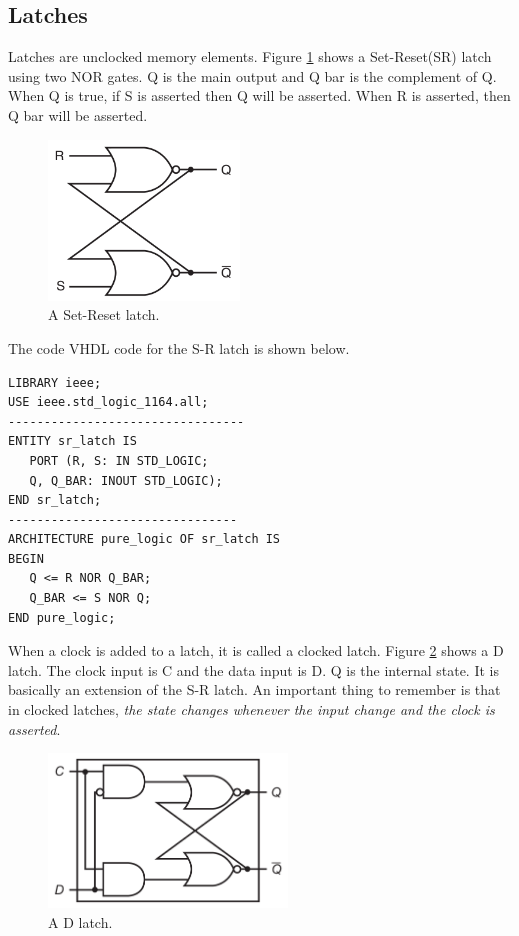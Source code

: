 \documentclass[a4paper, 11pt,oneside]{article}
\begin{document}
\subsection{Latches}
Latches are unclocked memory elements. Figure \ref{fig:latch0} shows a
Set-Reset(SR) latch using two NOR gates. Q is the main output and Q bar is the 
complement of Q. When Q is true, if S is asserted then Q will be asserted. 
When R is asserted, then Q bar will be asserted. 

\begin{figure}[H]
	\begin{center}
	\includegraphics[width=2in]{latch0.png}
	\caption{A Set-Reset latch.}
	\label{fig:latch0} 
	\end{center}
\end{figure}

The code VHDL code for the S-R latch is shown below.

\begin{verbatim}
LIBRARY ieee;
USE ieee.std_logic_1164.all;
---------------------------------
ENTITY sr_latch IS
   PORT (R, S: IN STD_LOGIC;
   Q, Q_BAR: INOUT STD_LOGIC);
END sr_latch;
--------------------------------
ARCHITECTURE pure_logic OF sr_latch IS
BEGIN
   Q <= R NOR Q_BAR;
   Q_BAR <= S NOR Q;
END pure_logic;
\end{verbatim}

When a clock is added to a latch, it is called a clocked latch. Figure 
\ref{fig:latch1} shows a D latch. The clock input is C and the data input is D. 
Q is the internal state. It is basically an extension of the S-R latch. An
important thing to remember is that in clocked latches, \textit{the state 
changes whenever the input change and the clock is asserted}.

\begin{figure}[H]
	\begin{center}
	\includegraphics[width=2.5in]{latch1.png}
	\caption{A D latch. }
	\label{fig:latch1} 
	\end{center}
\end{figure}
\end{document}
